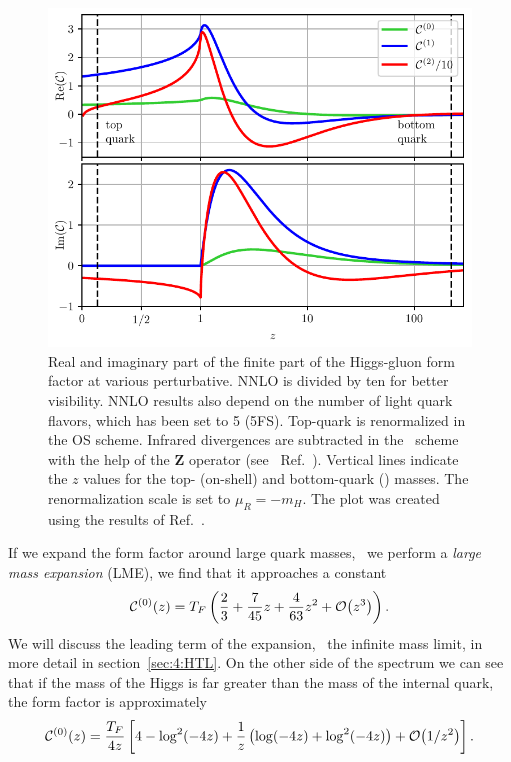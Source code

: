 \begin{figure}[h]
\centering
\includegraphics[width=\figurewidth]{Images/form_factor.pdf}
\caption{Real and imaginary part of the finite part of the Higgs-gluon form factor at various perturbative. \acs{NNLO} is divided by ten for better visibility. \acs{NNLO} results also depend on the number of light quark flavors, which has been set to 5 (5\acs{FS}). Top-quark is renormalized in the \acs{OS} scheme. Infrared divergences are subtracted in the \MS\ scheme with the help of the $\mathbf{Z}$ operator (see \eg\ Ref.~\cite{Czakon:2014oma}). Vertical lines indicate the $z$ values for the top- (on-shell) and bottom-quark (\MS) masses. The renormalization scale is set to $\mu_R = -m_H$. The plot was created using the results of Ref.~\cite{Czakon:2020vql}.}
\label{fig:4:form_factor}
\end{figure}
If we expand the form factor around large quark masses, \ie\ we perform a \textit{large mass expansion} (\acs{LME}), we find that it approaches a constant
\begin{equation}
\mathcal{C}^{(0)}(z) = T_F \left( \frac{2}{3} + \frac{7}{45} z + \frac{4}{63} z^2 + \mathcal{O}\!\left(z^3\right) \right).
\label{eq:4:LME}
\end{equation}
We will discuss the leading term of the expansion, \ie\ the infinite mass limit, in more detail in section~\ref{sec:4:HTL}. On the other side of the spectrum we can see that if the mass of the Higgs is far greater than the mass of the internal quark, the form factor is approximately
\begin{equation}
\mathcal{C}^{(0)}(z) = \frac{T_F}{4z} \left[ 4 - \log^2\!\left(-4 z \right) + \frac{1}{z} \left( \log\!\left(-4 z \right) + \log^2\!\left(-4 z \right) \right) + \mathcal{O}\!\left(1/z^2\right) \right].
\label{eq:4:C0_HEL}
\end{equation}
